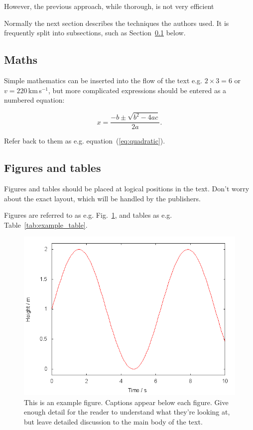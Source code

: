 \documentclass[a4paper,fleqn,usenatbib]{mnras}
\begin{document}
However, the previous approach, while thorough, is not very efficient

Normally the next section describes the techniques the authors used.
It is frequently split into subsections, such as Section~\ref{sec:maths} below.

\subsection{Maths}
\label{sec:maths} %

Simple mathematics can be inserted into the flow of the text e.g. $2\times3=6$
or $v=220$\,km\,s$^{-1}$, but more complicated expressions should be entered
as a numbered equation:

\begin{equation}
    x=\frac{-b\pm\sqrt{b^2-4ac}}{2a}.
	\label{eq:quadratic}
\end{equation}

Refer back to them as e.g. equation~(\ref{eq:quadratic}).

\subsection{Figures and tables}

Figures and tables should be placed at logical positions in the text. Don't
worry about the exact layout, which will be handled by the publishers.

Figures are referred to as e.g. Fig.~\ref{fig:example_figure}, and tables as
e.g. Table~\ref{tab:example_table}.

\begin{figure}
	\includegraphics[width=\columnwidth]{example}
    \caption{This is an example figure. Captions appear below each figure.
	Give enough detail for the reader to understand what they're looking at,
	but leave detailed discussion to the main body of the text.}
    \label{fig:example_figure}
\end{figure}
\end{document}
